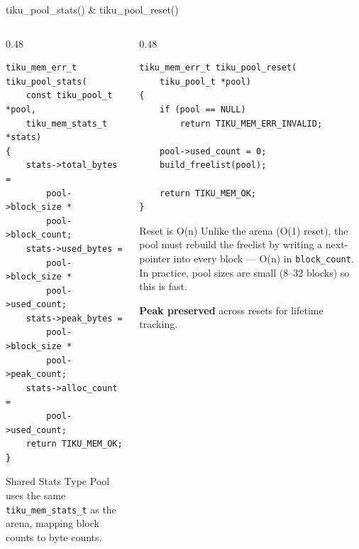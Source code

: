 \documentclass[aspectratio=169, 10pt]{beamer}
\begin{document}
\begin{frame}[fragile]{tiku\_pool\_stats() \& tiku\_pool\_reset()}
\begin{columns}[T]
\begin{column}{0.48\textwidth}
\begin{lstlisting}[style=cstyle, title={Stats --- O(1)}]
tiku_mem_err_t tiku_pool_stats(
    const tiku_pool_t *pool,
    tiku_mem_stats_t *stats)
{
    stats->total_bytes =
        pool->block_size *
        pool->block_count;
    stats->used_bytes =
        pool->block_size *
        pool->used_count;
    stats->peak_bytes =
        pool->block_size *
        pool->peak_count;
    stats->alloc_count =
        pool->used_count;
    return TIKU_MEM_OK;
}
\end{lstlisting}

\begin{block}{Shared Stats Type}
Pool uses the same \texttt{tiku\_mem\_stats\_t} as the arena,
mapping block counts to byte counts.
\end{block}
\end{column}

\begin{column}{0.48\textwidth}
\begin{lstlisting}[style=cstyle, title={Reset --- O(n)}]
tiku_mem_err_t tiku_pool_reset(
    tiku_pool_t *pool)
{
    if (pool == NULL)
        return TIKU_MEM_ERR_INVALID;

    pool->used_count = 0;
    build_freelist(pool);

    return TIKU_MEM_OK;
}
\end{lstlisting}

\vspace{0.3em}
\begin{alertblock}{Reset is O(n)}
Unlike the arena (O(1) reset), the pool must rebuild the
freelist by writing a next-pointer into every block ---
O(n) in \texttt{block\_count}. In practice, pool sizes are
small (8--32 blocks) so this is fast.
\end{alertblock}

\textbf{Peak preserved} across resets for lifetime tracking.
\end{column}
\end{columns}
\end{frame}
\end{document}
